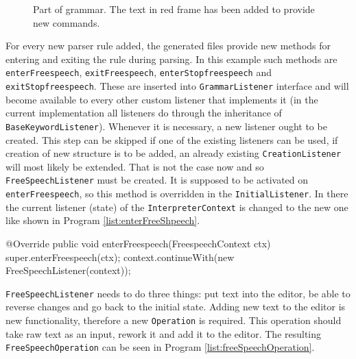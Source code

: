 \begin{figure}[hbt!]
    \centering
    \caption{Part of grammar. The text in red frame has been added to provide new commands.}
    \label{fig:grammarChange}
\end{figure}

For every new parser rule added, the generated files provide new methods for entering and exiting the rule during parsing. In this example such methods are \texttt{enterFreespeech}, \texttt{exitFreespeech},  \texttt{enterStopfreespeech} and \texttt{exitStopfreespeech}. These are inserted into \texttt{GrammarListener} interface and will become available to every other custom listener that implements it (in the current implementation all listeners do through the inheritance of \texttt{BaseKeywordListener}). Whenever it is necessary, a new listener ought to be created. This step can be skipped if one of the existing listeners can be used, \eg if creation of new structure is to be added, an already existing \texttt{CreationListener} will most likely be extended. That is not the case now and so \texttt{FreeSpeechListener} must be created. It is supposed to be activated on \texttt{enterFreespeech}, so this method is overridden in the \texttt{InitialListener}. In there the current listener (state) of the \texttt{InterpreterContext} is changed to the new one like shown in Program \ref{list:enterFreeShpeech}. 

\begin{program}[hbt!]
    \caption{Replacing the current listener to \texttt{FreeSpeechListener} triggered by ``enter free speech'' command.}
    \label{list:enterFreeShpeech}
    \begin{JavaCode}
	@Override
	public void enterFreespeech(FreespeechContext ctx) {
		super.enterFreespeech(ctx);
		context.continueWith(new FreeSpeechListener(context));
	}   \end{JavaCode}
\end{program}

\texttt{FreeSpeechListener} needs to do three things: put text into the editor, be able to reverse changes and go back to the initial state. Adding new text to the editor is new functionality, therefore a new \texttt{Operation} is required. This operation should take raw text as an input, rework it and add it to the editor. The resulting \texttt{FreeSpeechOperation} can be seen in Program \ref{list:freeSpeechOperation}. 

